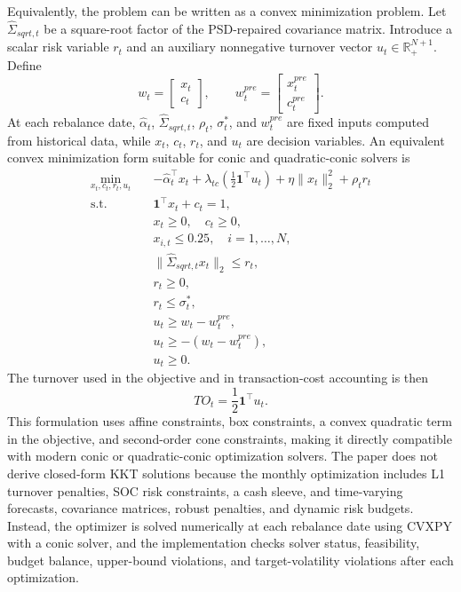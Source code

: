 \documentclass[11pt]{article}
\begin{document}
Equivalently, the problem can be written as a convex minimization problem. Let
\(\hat{\Sigma}_{sqrt,t}\) be a square-root factor of the PSD-repaired covariance
matrix. Introduce a scalar risk variable \(r_t\) and an auxiliary nonnegative
turnover vector \(u_t\in\mathbb{R}^{N+1}_+\). Define
\begin{equation}
w_t=
\begin{bmatrix}
x_t\\ c_t
\end{bmatrix},
\qquad
w_t^{pre}=
\begin{bmatrix}
x_t^{pre}\\ c_t^{pre}
\end{bmatrix}.
\end{equation}
At each rebalance date, \(\hat{\alpha}_t\), \(\hat{\Sigma}_{sqrt,t}\),
\(\rho_t\), \(\sigma_t^*\), and \(w_t^{pre}\) are fixed inputs computed from
historical data, while \(x_t\), \(c_t\), \(r_t\), and \(u_t\) are decision
variables. An equivalent convex minimization form suitable for conic and
quadratic-conic solvers is
\begin{align}
\min_{x_t,c_t,r_t,u_t}\quad
&-\hat{\alpha}_t^\top x_t
+\lambda_{tc}\left(\frac12\mathbf{1}^\top u_t\right)
+\eta\|x_t\|_2^2
+\rho_t r_t\\
\text{s.t.}\quad
&\mathbf{1}^\top x_t+c_t=1,\\
&x_t\ge0,\quad c_t\ge0,\\
&x_{i,t}\le0.25,\quad i=1,\ldots,N,\\
&\|\hat{\Sigma}_{sqrt,t}x_t\|_2\le r_t,\\
&r_t\ge0,\\
&r_t\le\sigma_t^*,\\
&u_t\ge w_t-w_t^{pre},\\
&u_t\ge-(w_t-w_t^{pre}),\\
&u_t\ge0.
\end{align}
The turnover used in the objective and in transaction-cost accounting is then
\begin{equation}
TO_t=\frac12\mathbf{1}^\top u_t.
\end{equation}
This formulation uses affine constraints, box constraints, a convex quadratic
term in the objective, and second-order cone constraints, making it directly
compatible with modern conic or quadratic-conic optimization solvers. The paper
does not derive closed-form KKT solutions because the monthly optimization
includes L1 turnover penalties, SOC risk constraints, a cash sleeve, and
time-varying forecasts, covariance matrices, robust penalties, and dynamic risk
budgets. Instead, the optimizer is solved numerically at each rebalance date
using CVXPY with a conic solver, and the implementation checks solver status,
feasibility, budget balance, upper-bound violations, and target-volatility
violations after each optimization.
\end{document}
